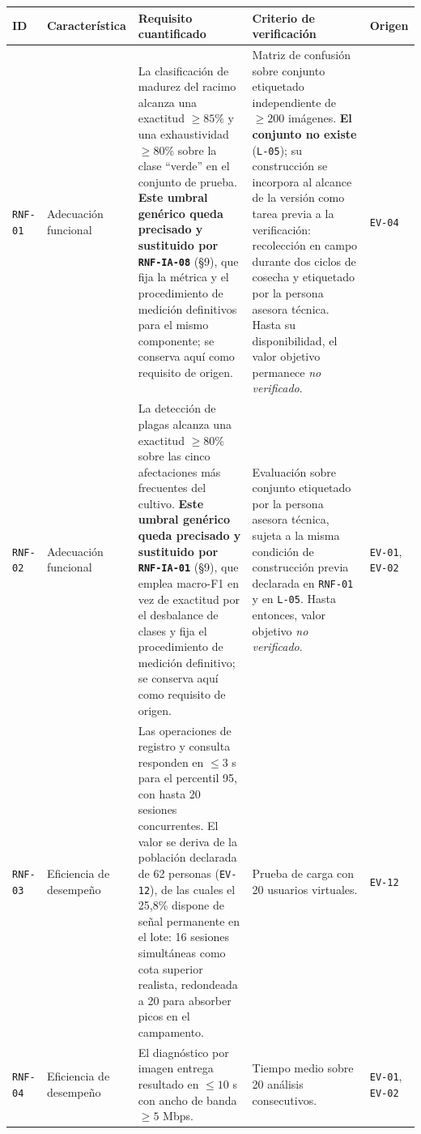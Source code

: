\documentclass[11pt,a4paper]{article}
\newcommand{\id}[1]{\texttt{\begingroup\hyphenpenalty=10000\relax#1\endgroup}}
\renewcommand{\id}[1]{\texttt{#1}}
\begin{document}
{\setlength{\tabcolsep}{4pt}
\begin{longtable}{|C{1.2cm}|L{2.4cm}|L{5.8cm}|L{3.1cm}|L{2.2cm}|}
\hline
{}\textbf{ID} & \textbf{Característica} & \textbf{Requisito cuantificado} & \textbf{Criterio de verificación} & \textbf{Origen} \\
\hline
\endhead
\id{RNF-01} & Adecuación funcional & La clasificación de madurez del racimo alcanza una exactitud $\geq 85\%$ y una exhaustividad $\geq 80\%$ sobre la clase ``verde'' en el conjunto de prueba. \textbf{Este umbral genérico queda precisado y sustituido por \id{RNF-IA-08}} (§9), que fija la métrica y el procedimiento de medición definitivos para el mismo componente; se conserva aquí como requisito de origen. & Matriz de confusión sobre conjunto etiquetado independiente de $\geq 200$ imágenes. \textbf{El conjunto no existe} (\id{L-05}); su construcción se incorpora al alcance de la versión como tarea previa a la verificación: recolección en campo durante dos ciclos de cosecha y etiquetado por la persona asesora técnica. Hasta su disponibilidad, el valor objetivo permanece \emph{no verificado}. & \footnotesize \id{EV-04} \\ \hline
\id{RNF-02} & Adecuación funcional & La detección de plagas alcanza una exactitud $\geq 80\%$ sobre las cinco afectaciones más frecuentes del cultivo. \textbf{Este umbral genérico queda precisado y sustituido por \id{RNF-IA-01}} (§9), que emplea macro-F1 en vez de exactitud por el desbalance de clases y fija el procedimiento de medición definitivo; se conserva aquí como requisito de origen. & Evaluación sobre conjunto etiquetado por la persona asesora técnica, sujeta a la misma condición de construcción previa declarada en \id{RNF-01} y en \id{L-05}. Hasta entonces, valor objetivo \emph{no verificado}. & \footnotesize \id{EV-01}, \id{EV-02} \\ \hline
\id{RNF-03} & Eficiencia de desempeño & Las operaciones de registro y consulta responden en $\leq 3$ s para el percentil 95, con hasta 20 sesiones concurrentes. El valor se deriva de la población declarada de 62 personas (\id{EV-12}), de las cuales el 25,8\% dispone de señal permanente en el lote: 16 sesiones simultáneas como cota superior realista, redondeada a 20 para absorber picos en el campamento. & Prueba de carga con 20 usuarios virtuales. & \footnotesize \id{EV-12} \\ \hline
\id{RNF-04} & Eficiencia de desempeño & El diagnóstico por imagen entrega resultado en $\leq 10$ s con ancho de banda $\geq 5$ Mbps. & Tiempo medio sobre 20 análisis consecutivos. & \footnotesize \id{EV-01}, \id{EV-02} \\ \hline

\end{longtable}}
\end{document}
